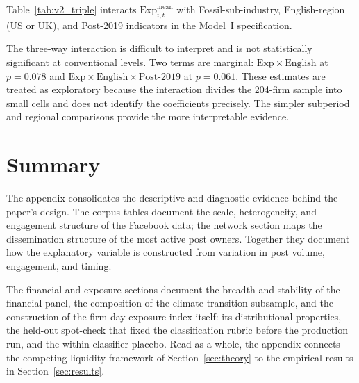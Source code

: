 \documentclass{article}
\theoremstyle{plain}
\begin{document}
Table~\ref{tab:v2_triple} interacts $\mathrm{Exp}^{\text{mean}}_{i,t}$ with Fossil-sub-industry, English-region (US or UK), and Post-2019 indicators in the Model~I specification.



The three-way interaction is difficult to interpret and is not statistically significant at conventional levels. Two terms are marginal: $\mathrm{Exp}\times\text{English}$ at $p=0.078$ and $\mathrm{Exp}\times\text{English}\times\text{Post-2019}$ at $p=0.061$. These estimates are treated as exploratory because the interaction divides the 204-firm sample into small cells and does not identify the coefficients precisely. The simpler subperiod and regional comparisons provide the more interpretable evidence.

\FloatBarrier
\section{Summary}

The appendix consolidates the descriptive and diagnostic evidence behind the paper's design. The corpus tables document the scale, heterogeneity, and engagement structure of the Facebook data; the network section maps the dissemination structure of the most active post owners. Together they document how the explanatory variable is constructed from variation in post volume, engagement, and timing.

The financial and exposure sections document the breadth and stability of the financial panel, the composition of the climate-transition subsample, and the construction of the firm-day exposure index itself: its distributional properties, the held-out spot-check that fixed the classification rubric before the production run, and the within-classifier placebo. Read as a whole, the appendix connects the competing-liquidity framework of Section~\ref{sec:theory} to the empirical results in Section~\ref{sec:results}.
\end{document}
